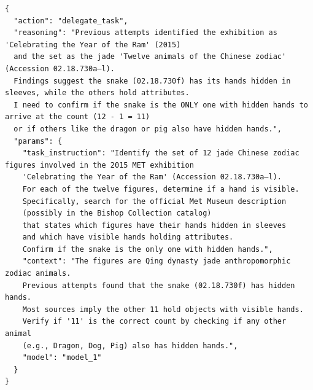 \begin{tcolorbox}[
  title={\textbf{\small Attempt 9 - Main Decision}},
  boxrule=1pt,
  arc=0mm,
  colback=gray!5,
  colframe=gray!70,
  breakable,
  before skip=10pt,
  after skip=10pt,
  pad at break=2mm,
  parbox=false
]
\begin{verbatim}
{
  "action": "delegate_task",
  "reasoning": "Previous attempts identified the exhibition as 'Celebrating the Year of the Ram' (2015) 
  and the set as the jade 'Twelve animals of the Chinese zodiac' (Accession 02.18.730a–l). 
  Findings suggest the snake (02.18.730f) has its hands hidden in sleeves, while the others hold attributes. 
  I need to confirm if the snake is the ONLY one with hidden hands to arrive at the count (12 - 1 = 11) 
  or if others like the dragon or pig also have hidden hands.",
  "params": {
    "task_instruction": "Identify the set of 12 jade Chinese zodiac figures involved in the 2015 MET exhibition 
    'Celebrating the Year of the Ram' (Accession 02.18.730a–l). 
    For each of the twelve figures, determine if a hand is visible. 
    Specifically, search for the official Met Museum description 
    (possibly in the Bishop Collection catalog) 
    that states which figures have their hands hidden in sleeves 
    and which have visible hands holding attributes. 
    Confirm if the snake is the only one with hidden hands.",
    "context": "The figures are Qing dynasty jade anthropomorphic zodiac animals. 
    Previous attempts found that the snake (02.18.730f) has hidden hands.
    Most sources imply the other 11 hold objects with visible hands.
    Verify if '11' is the correct count by checking if any other animal 
    (e.g., Dragon, Dog, Pig) also has hidden hands.",
    "model": "model_1"
  }
}
\end{verbatim}
\end{tcolorbox}

